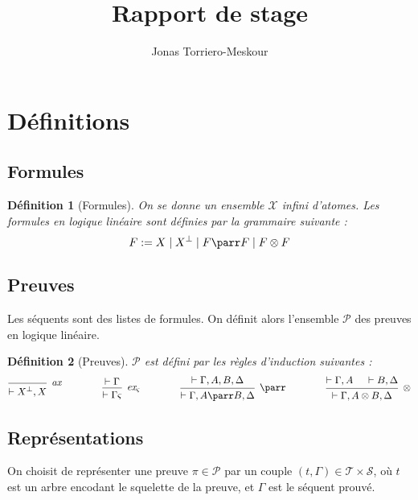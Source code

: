 \documentclass[11pt,a4paper]{article}
\title{Rapport de stage}
\author{Jonas Torriero-Meskour}
\newtheorem{definition}{Définition}
\newcommand*{\orth}{^\perp}
\newcommand*{\tensor}{\otimes}
\newcommand*{\hypv}[1]{\hypo{\vdash #1}}
\newcommand*{\axv}[1]{\infer{0}[\ensuremath{\mathit{ax}}]{\vdash #1}}
\newcommand*{\tensorv}[1]{\infer{2}[\ensuremath{\tensor}]{\vdash #1}}
\newcommand*{\parrv}[1]{\infer{1}[\ensuremath{\parr}]{\vdash #1}}
\newcommand*{\permv}[2]{\infer{1}[\ensuremath{\textit{ex}_{#1}}]{\vdash #2}}
\newcommand*{\permapp}[2]{#2 #1}
\newcommand*{\someperm}{\varsigma}
\newcommand*{\someproof}{\pi}
\newcommand*{\sequent}{\Gamma}
\newcommand*{\proofs}{\ensuremath{\mathcal{P}}}
\newcommand*{\sequents}{\ensuremath{\mathcal{S}}}
\newcommand*{\trees}{\ensuremath{\mathcal{T}}}
\newcommand*{\representationslarge}{\ensuremath{\trees \times \sequents}}
\begin{document}
\maketitle

\section{Définitions}

\subsection{Formules}
\begin{definition}[Formules]
On se donne un ensemble $\mathcal{X}$ infini d'atomes. Les formules en logique linéaire sont définies par la grammaire suivante :
\begin{equation*}
F := X \mid X\orth \mid F \parr F \mid F \tensor F
\end{equation*}
\end{definition}

\subsection{Preuves}
Les séquents sont des listes de formules. On définit alors l'ensemble \proofs{} des preuves en logique linéaire.
\begin{definition}[Preuves]
\proofs{} est défini par les règles d'induction suivantes :
\begin{equation*}
\begin{prooftree}
  \axv{X\orth, X}
\end{prooftree}
\qquad\qquad
\begin{prooftree}
  \hypv{\Gamma}
  \permv{\someperm}{\permapp{\someperm}{\Gamma}}
\end{prooftree}
\qquad\qquad
\begin{prooftree}
  \hypv{\Gamma, A, B, \Delta}
  \parrv{\Gamma, A \parr B, \Delta}
\end{prooftree}
\qquad\qquad
\begin{prooftree}
  \hypv{\Gamma, A}
  \hypv{B, \Delta}
  \tensorv{\Gamma, A \tensor B, \Delta}
\end{prooftree}
\end{equation*}
\end{definition}

\subsection{Représentations}
On choisit de représenter une preuve $\someproof \in \mathcal{P}$ par un couple $(t, \sequent) \in \representationslarge$, où $t$ est un arbre encodant le squelette de la preuve, et $\sequent$ est le séquent prouvé.
\end{document}
